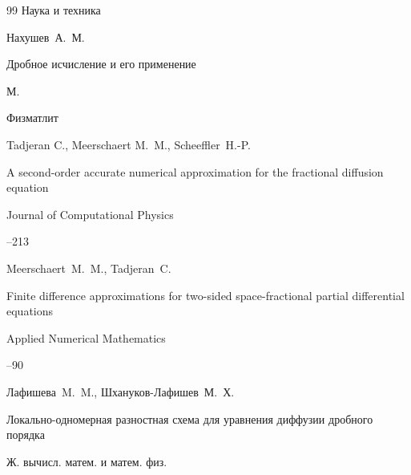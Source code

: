 \begin{thebibliography}{99}
\publ Наука и техника






\by Нахушев~А.~М.

\book Дробное исчисление и его применение

\publaddr М.

\publ Физматлит 






\by Tadjeran C., Meerschaert M.~M., Scheeffler~H.-P.

\paper A second-order accurate numerical approximation for the fractional diffusion equation

\jour Journal of Computational Physics




--213







\by  Meerschaert~M.~M., Tadjeran~C.

\paper Finite difference approximations for two-sided space-fractional partial differential equations

\jour Applied Numerical Mathematics 




--90









\by Лафишева~M.~M., Шхануков-Лафишев~М.~Х.

\paper Локально-одномерная разностная схема для уравнения диффузии дробного порядка

\jour Ж. вычисл. матем. и матем. физ.




\end{thebibliography}
